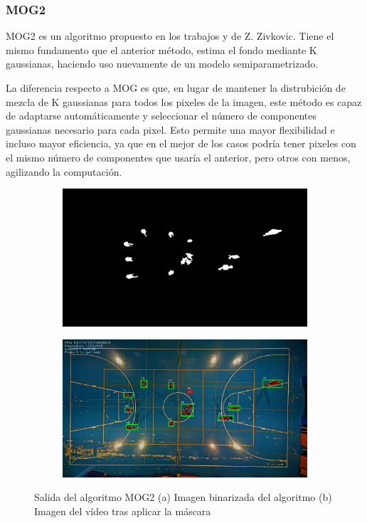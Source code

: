 \subsubsection*{MOG2}
MOG2 es un algoritmo propuesto en los trabajos \cite{art:Zivkovic1} y \cite{art:Zivkovic2} de Z. Zivkovic. Tiene el mismo fundamento que el anterior método, estima el fondo mediante K gaussianas, haciendo uso nuevamente de un modelo semiparametrizado. 

La diferencia respecto a MOG es que, en lugar de mantener la distrubición de mezcla de K gaussianas para todos los pixeles de la imagen, este método es capaz de adaptarse automáticamente y seleccionar el número de componentes gaussianas necesario para cada pixel. Esto permite una mayor flexibilidad e incluso mayor eficiencia, ya que en el mejor de los casos podría tener pixeles con el mismo número de componentes que usaría el anterior, pero otros con menos, agilizando la computación.

\begin{figure}
\begin{subfigure}{.5\textwidth}
  \centering
  \includegraphics[width=.9\linewidth]{images/MOG2sub}
  \caption { }
  \label{fig:MOG21a}
\end{subfigure}%
\begin{subfigure}{.5\textwidth}
  \centering
  \includegraphics[width=.9\linewidth]{images/MOG2}
  \caption { }
  \label{fig:MOG21b}
\end{subfigure}
\caption{Salida del algoritmo MOG2 (a) Imagen binarizada del algoritmo (b) Imagen del vídeo tras aplicar la máscara }
\label{fig:MOG2}
\end{figure}

